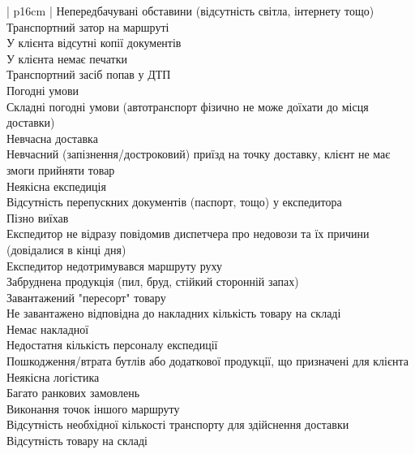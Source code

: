 \begin{mytable*}{ | p{16cm} | }
	\nopagebreak\quad Непередбачувані обставини (відсутність світла, інтернету тощо) \\
	\nopagebreak\quad Транспортний затор на маршруті \\
	\nopagebreak\quad У клієнта відсутні копії документів \\
	\nopagebreak\quad У клієнта немає печатки \\
	\nopagebreak\quad Транспортний засіб попав у ДТП \\
	\hline
	Погодні умови \\
	\nopagebreak\quad Складні погодні умови (автотранспорт фізично не може доїхати до місця доставки) \\
	\hline
	Невчасна доставка \\
	\nopagebreak\quad Невчасний (запізнення/достроковий) приїзд на точку доставку, клієнт не має змоги прийняти товар \\
	\hline
	Неякісна експедиція \\
	\nopagebreak\quad Відсутність перепускних документів (паспорт, тощо) у експедитора \\
	\nopagebreak\quad Пізно виїхав \\
	\nopagebreak\quad Експедитор не відразу повідомив диспетчера про недовози та їх причини (довідалися в кінці дня) \\
	\nopagebreak\quad Експедитор недотримувався маршруту руху \\
	\nopagebreak\quad Забруднена продукція (пил, бруд, стійкий сторонній запах) \\
	\nopagebreak\quad Завантажений "пересорт" товару \\
	\nopagebreak\quad Не завантажено відповідна до накладних кількість товару на складі \\
	\nopagebreak\quad Немає  накладної \\
	\nopagebreak\quad Недостатня кількість персоналу експедиції \\
	\nopagebreak\quad Пошкодження/втрата бутлів або додаткової продукції, що призначені для клієнта \\
	\hline
	Неякісна логістика \\
	\nopagebreak\quad Багато ранкових замовлень \\
	\nopagebreak\quad Виконання точок іншого маршруту \\
	\nopagebreak\quad Відсутність необхідної кількості транспорту для здійснення доставки \\
	\nopagebreak\quad Відсутність товару на складі \\

\end{mytable*}
